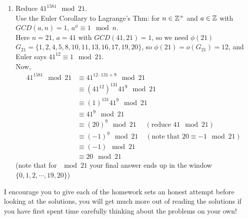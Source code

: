 \begin{enumerate}
\begin{enumerate}[a)]
    \item There are $9$ right cosets of $K$ in $H$; they partition $H$ and each has $3$ elts. 
    \begin{align*}
        K0 &= \{0, 18, 36\} \ \ \ \ K6 = \{6, 24,42\} \ \ \ \ \ \ \ \ K12 = \{12, 30, 48\}   \\
        K2 &= \{2, 20, 38\} \ \ \ \ K8 = \{8, 26, 44\} \ \ \ \ \ \ \ \ K14 = \{14, 32, 50\}  \\
        K4 &= \{4, 22, 40\} \ \ \ \ K10 = \{10, 28, 46\} \ \ \ \ K16 = \{16, 34, 52\}  \\
    \end{align*}
\end{enumerate}
\item Reduce $41^{1581} \mod 21$. \\
Use the Euler Corollary to Lagrange's Thm: for $n\in {\mathbb{Z}}^+$ and $a\in {\mathbb{Z}}$ with $GCD(a,n)=1$, $a^{\phi} \equiv 1 \mod n$. \\ 

Here $n=21$, $a=41$ with $GCD(41,21)=1$, so we need $\phi(21)$ \\

$G_{21}= \{1,2,4,5,8,10,11,13,16,17,19,20\}$, so $\phi(21)=o(G_{21})=12$, and Euler says $41^{12}\equiv 1 \mod 21$. \\

Now,
\begin{align*}
    41^{1581}\mod 21 &\equiv 41^{12\cdot 131 + 9} \mod 21 \\ 
    &\equiv (41^{12})^{131}41^{9} \mod 21 \\
    &\equiv (1)^{131}41^{9} \mod 21 \\
    &\equiv 41^9 \mod 21 \\
    &\equiv (20)^9 \mod 21 \ \ \ \ \ \ (\text{reduce }41 \mod 21) \\
    &\equiv (-1)^{9}\mod 21 \ \ \ \ \ (\text{note that }20 \equiv -1 \mod 21) \\
    &\equiv (-1) \mod 21 \\
    &\equiv 20 \mod 21 
\end{align*}
(note that for $\mod 21$ your final answer ends up in the window $\{0,1,2,\cdots, 19, 20\}$)
\end{enumerate}
\newpage

\begin{tcolorbox}
    I encourage you to give each of the homework sets an honest attempt before looking at the solutions, you will get much more out of reading the solutions if you have first spent time carefully thinking about the problems on your own!
\end{tcolorbox}
\vspace{-0.2in}
